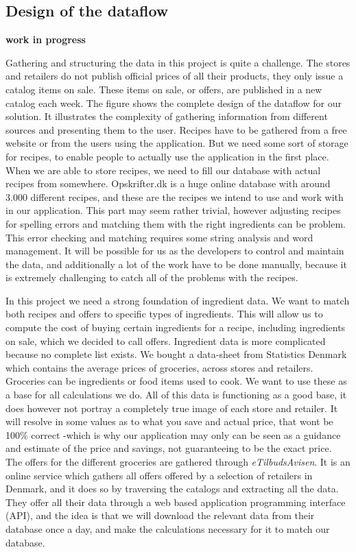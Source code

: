 \subsection{Design of the dataflow}\label{subsec:dataflow}

\textbf{work in progress}

Gathering and structuring the data in this project is quite a challenge. The stores and retailers do not publish official prices of all their products, they only issue a catalog items on sale. These items on sale, or offers, are published in a new catalog each week. The figure  shows the complete design of the dataflow for our solution. It illustrates the complexity of gathering information from different sources and presenting them to the user. Recipes have to be gathered from a free website or from the users using the application. But we need some sort of storage for recipes, to enable people to actually use the application in the first place. When we are able to store recipes, we need to fill our database with actual recipes from somewhere. Opskrifter.dk is a huge online database with around 3.000 different recipes, and these are the recipes we intend to use and work with in our application. This part may seem rather trivial, however adjusting recipes for spelling errors and matching them with the right ingredients can be problem. This error checking and matching requires some string analysis and word management. It will be possible for us as the developers to control and maintain the data, and additionally a lot of the work have to be done manually, because it is extremely challenging to catch all of the problems with the recipes.

In this project we need a strong foundation of ingredient data. We want to match both recipes and offers to specific types of ingredients. This will allow us to compute the cost of buying certain ingredients for a recipe, including ingredients on sale, which we decided to call offers. Ingredient data is more complicated because no complete list exists. We bought a data-sheet from Statistics Denmark which contains the average prices of groceries, across stores and retailers. Groceries can be ingredients or food items used to cook. We want to use these as a base for all calculations we do. All of this data is functioning as a good base, it does however not portray a completely true image of each store and retailer. It will resolve in some values as to what you save and actual price, that wont be 100\% correct -which is why our application may only can be seen as a guidance and estimate of the price and savings, not guaranteeing to be the exact price. The offers for the different groceries are gathered through \textit{eTilbudsAvisen}. It is an online service which gathers all offers offered by a selection of retailers in Denmark, and it does so by traversing the catalogs and extracting all the data. They offer all their data through a web based application programming interface (API), and the idea is that we will download the relevant data from their database once a day, and make the calculations necessary for it to match our database. 

